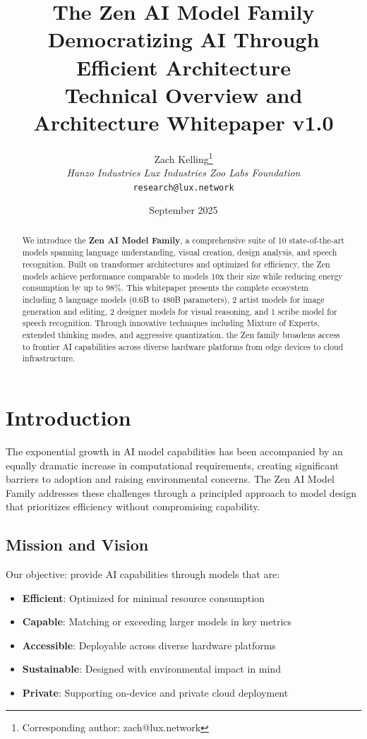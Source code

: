 \documentclass[11pt,a4paper]{article}
\title{
    \vspace{-2cm}
    \Huge \textbf{The Zen AI Model Family} \\
    \vspace{0.5cm}
    \Large Democratizing AI Through Efficient Architecture \\
    \vspace{0.3cm}
    \normalsize Technical Overview and Architecture Whitepaper v1.0
}
\author{
    Zach Kelling\thanks{Corresponding author: zach@lux.network} \\
    \textit{Hanzo Industries \quad Lux Industries \quad Zoo Labs Foundation} \\
    \texttt{research@lux.network}
}
\date{September 2025}
\begin{document}
\maketitle

\begin{abstract}
We introduce the \textbf{Zen AI Model Family}, a comprehensive suite of 10 state-of-the-art models spanning language understanding, 
visual creation, design analysis, and speech recognition. Built on transformer architectures and optimized 
for efficiency, the Zen models achieve performance comparable to models 10x their size while reducing energy consumption by up to 98\%. 
This whitepaper presents the complete ecosystem including 5 language models (0.6B to 480B parameters), 2 artist models for image 
generation and editing, 2 designer models for visual reasoning, and 1 scribe model for speech recognition. Through innovative 
techniques including Mixture of Experts, extended thinking modes, and aggressive quantization, the Zen family broadens 
access to frontier AI capabilities across diverse hardware platforms from edge devices to cloud infrastructure.
\end{abstract}

\tableofcontents
\newpage

\section{Introduction}

The exponential growth in AI model capabilities has been accompanied by an equally dramatic increase in computational requirements, 
creating significant barriers to adoption and raising environmental concerns. The Zen AI Model Family addresses these challenges 
through a principled approach to model design that prioritizes efficiency without compromising capability.

\subsection{Mission and Vision}

Our objective: provide AI capabilities through models that are:
\begin{itemize}
    \item \textbf{Efficient}: Optimized for minimal resource consumption
    \item \textbf{Capable}: Matching or exceeding larger models in key metrics
    \item \textbf{Accessible}: Deployable across diverse hardware platforms
    \item \textbf{Sustainable}: Designed with environmental impact in mind
    \item \textbf{Private}: Supporting on-device and private cloud deployment
\end{itemize}
\end{document}
